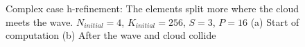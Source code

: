 \begin{figure}[H]
	\centering
	\hfill
	\caption{Complex case h-refinement: The elements split more where the cloud meets the wave. \(N_{initial} = 4\), \(K_{initial} = 256\), \(S = 3\), \(P = 16\) (a) Start of computation (b) After the wave and cloud collide}\label{fig:cloud_s}
\end{figure}

